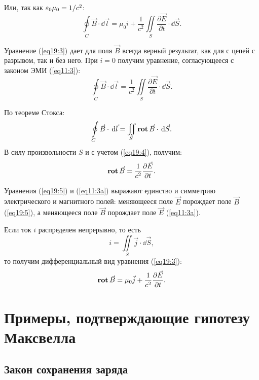 	Или, так как \( \varepsilon_0\mu_0 = 1/c^2 \):
	\begin{equation}
		\oint\limits_C \vec{B}\cdot\dd\vec{l} = \mu_0i +
        \frac{1}{c^2}\iint\limits_S
        \frac{\partial\vec{E}}{\partial t}\cdot\dd\vec{S}.
        \label{eq19:3}
	\end{equation}
	
	Уравнение (\ref{eq19:3}) дает для поля \( \vec{B} \) всегда верный
    результат, как для с цепей с разрывом, так и без него. При \( i = 0 \)
    получим уравнение, согласующееся с законом ЭМИ (\ref{eq11:3}):
	\begin{equation}
		\oint\limits_C \vec{B}\cdot\dd\vec{l} =
        \frac{1}{c^2}\iint\limits_S
        \frac{\partial\vec{E}}{\partial t}\cdot\dd\vec{S}.
        \label{eq19:4}
	\end{equation}
	
	По теореме Стокса:
	\[
        \oint\limits_C \vec{B}\cdot\,\mathrm{d}\vec{l} =
        \iint\limits_S \mathbf{rot\,}\vec{B}\cdot\,\mathrm{d}\vec{S}.
    \]
	В силу произвольности \( S \) и с учетом (\ref{eq19:4}), получим:
	\begin{equation}
		\mathbf{rot\,}\vec{B} = \frac{1}{c^2}\frac{\partial\vec{E}}{\partial t}.
        \label{eq19:5}
	\end{equation}
	
	Уравнения (\ref{eq19:5}) и (\ref{eq11:3a}) выражают единство и симметрию
    электрического и магнитного полей: меняющееся поле \( \vec{E} \) порождает
    поле \( \vec{B} \) (\ref{eq19:5}), а меняющееся поле \( \vec{B} \) порождает
    поле \( \vec{E} \) (\ref{eq11:3a}).
	
	Если ток \( i \) распределен непрерывно, то есть
    \[
        i = \iint\limits_S \vec{j}\cdot\dd\vec{S},
    \]
    то получим дифференциальный вид уравнения (\ref{eq19:3}):
	\begin{equation}
		\mathbf{rot\,}\vec{B} = \mu_0\vec{j} +
        \frac{1}{c^2}\frac{\partial \vec{E}}{\partial t}.
        \label{eq19:3a}
	\end{equation}
	
\section{Примеры, подтверждающие гипотезу Максвелла}

    \subsection{Закон сохранения заряда}
        
